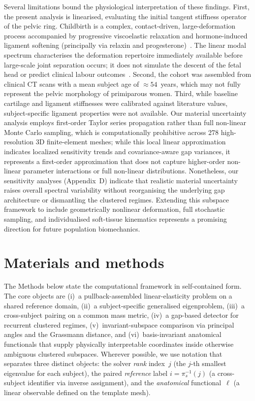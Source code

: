 \documentclass[11pt]{article}
\begin{document}
Several limitations bound the physiological interpretation of these findings.
First, the present analysis is linearised, evaluating the initial tangent stiffness operator of the pelvic ring.
Childbirth is a complex, contact-driven, large-deformation process accompanied by progressive viscoelastic relaxation and hormone-induced ligament softening (principally via relaxin and progesterone)~\citep{BiomechPregnancy2022,ChenGrimm2021,Almeida2024Uterus,Vleeming2012}.
The linear modal spectrum characterises the deformation repertoire immediately available before large-scale joint separation occurs; it does not simulate the descent of the fetal head or predict clinical labour outcomes~\citep{BonetWood1997}.
Second, the cohort was assembled from clinical CT scans with a mean subject age of $\approx 54$~years, which may not fully represent the pelvic morphology of primiparous women.
Third, while baseline cartilage and ligament stiffnesses were calibrated against literature values, subject-specific ligament properties were not available.
Our material uncertainty analysis employs first-order Taylor series propagation rather than full non-linear Monte Carlo sampling, which is computationally prohibitive across 278 high-resolution 3D finite-element meshes; while this local linear approximation indicates localized sensitivity trends and covariance-aware gap variances, it represents a first-order approximation that does not capture higher-order non-linear parameter interactions or full non-linear distributions.
Nonetheless, our sensitivity analyses (Appendix~D) indicate that realistic material uncertainty raises overall spectral variability without reorganising the underlying gap architecture or dismantling the clustered regimes.
Extending this subspace framework to include geometrically nonlinear deformation, full stochastic sampling, and individualised soft-tissue kinematics represents a promising direction for future population biomechanics.

\section{Materials and methods}
\label{sec:methods}

The Methods below state the computational framework in self-contained form.
The core objects are (i)~a pullback-assembled linear-elasticity problem on a shared reference domain, (ii)~a subject-specific generalised eigenproblem, (iii)~a cross-subject pairing on a common mass metric, (iv)~a gap-based detector for recurrent clustered regimes, (v)~invariant-subspace comparison via principal angles and the Grassmann distance, and (vi)~basis-invariant anatomical functionals that supply physically interpretable coordinates inside otherwise ambiguous clustered subspaces.
Wherever possible, we use notation that separates three distinct objects: the solver \emph{rank} index~$j$ (the $j$-th smallest eigenvalue for each subject), the paired \emph{reference} label $i = \pi_s^{-1}(j)$ (a cross-subject identifier via inverse assignment), and the \emph{anatomical} functional~$\ell$ (a linear observable defined on the template mesh).
\end{document}

